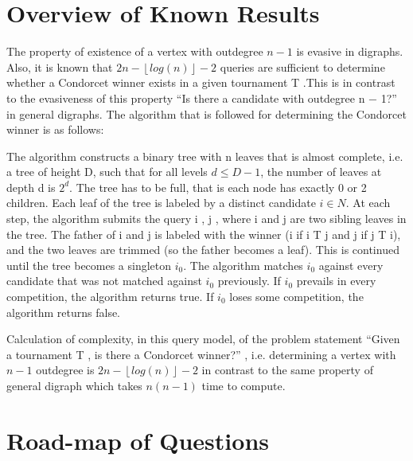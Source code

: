 \documentclass{article}
\begin{document}
\section{Overview of Known Results}

The property of existence of a vertex with outdegree \(n-1\) is evasive in digraphs. Also, it is known that \( 2n-\left \lfloor{log (n)}\right \rfloor-2\) queries are sufficient to determine whether a Condorcet winner exists in a given tournament T .This is in contrast to the evasiveness of this property “Is there a candidate with outdegree n − 1?” in general digraphs. The algorithm that is followed for determining the Condorcet winner is as follows: \par
The algorithm constructs a binary tree with n leaves that is almost complete, i.e. a tree of height D, such that for all levels \(d \leq D-1\), the number of leaves at depth d is \(2^d\). The tree has to be full, that is each node has exactly 0 or 2 children. Each leaf of the tree is
labeled by a distinct candidate \(i \in N\). At each step, the algorithm submits the query i , j , where i and j are two sibling leaves in the tree. The father of i and j is labeled with the winner (i if i T j and j if j T i), and the two leaves are trimmed (so the father becomes a leaf). This is continued until the tree becomes a singleton \(i_0\). The algorithm matches \(i_0\) against every candidate
that was not matched against \(i_0\) previously. If \(i_0\) prevails in every competition, the algorithm returns true. If \(i_0\) loses
some competition, the algorithm returns false.\par
Calculation of complexity, in this query model, of the problem statement “Given a tournament T , is there a Condorcet winner?” , i.e. determining a vertex with \(n-1\) outdegree is \( 2n-\left \lfloor{log (n)}\right \rfloor-2\) in contrast to the same property of general digraph which takes \(n(n-1)\) time to compute.


\section{Road-map of Questions}
\end{document}

